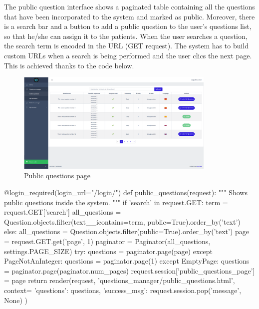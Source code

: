 \documentclass[12pt,english]{article}
\begin{document}
The public question interface shows a paginated table containing all the questions that have been incorporated to the system and marked as public. Moreover, there is a search bar and a button to add a public question to the user's questions list, so that he/she can assign it to the patients. When the user searches a question, the search term is encoded in the URL (GET request). The system has to build custom URLs when a search is being performed and the user clics the next page. This is achieved thanks to the code below.

\begin{figure}[H]
    \centering
    \includegraphics[width=0.85\textwidth]{public_questions.png}
    \caption{Public questions page}
\end{figure}

\begin{python}[caption={Method to show public questions page}, captionpos=b]
  @login_required(login_url="/login/")
  def public_questions(request):
      """
      Shows public questions inside the system.
      """
      if 'search' in request.GET:
          term = request.GET['search']
          all_questions = Question.objects.filter(text__icontains=term, public=True).order_by('text')
      else:
          all_questions = Question.objects.filter(public=True).order_by('text')
      page = request.GET.get('page', 1)
      paginator = Paginator(all_questions, settings.PAGE_SIZE)
      try:
          questions = paginator.page(page)
      except PageNotAnInteger:
          questions = paginator.page(1)
      except EmptyPage:
          questions = paginator.page(paginator.num_pages)
      request.session['public_questions_page'] = page
      return render(request, 'questions_manager/public_questions.html', context={
          'questions': questions,
          'success_msg': request.session.pop('message', None)
      })
\end{python}
\end{document}
